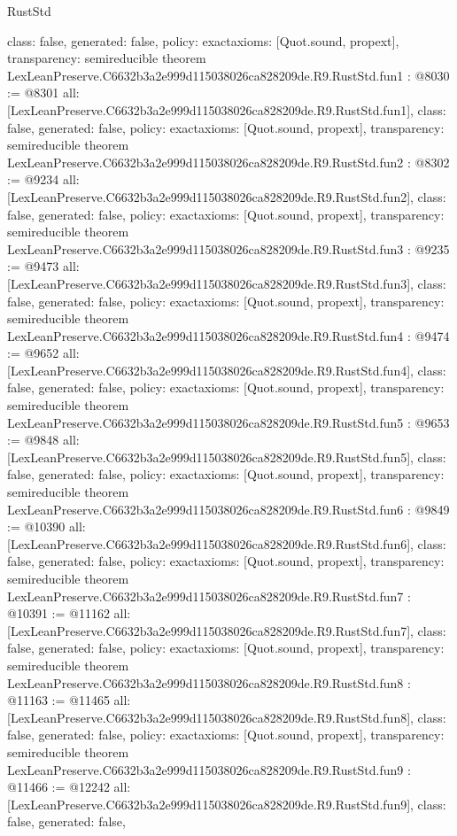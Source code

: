 \begin{lexlean}{RustStd}
\begin{coremodule}
{  class: false,
  generated: false,
  policy: exact{axioms: [Quot.sound, propext]},
  transparency: semireducible
}
theorem LexLeanPreserve.C6632b3a2e999d115038026ca828209de.R9.RustStd.fun1 : @8030 := @8301 {
  all: [LexLeanPreserve.C6632b3a2e999d115038026ca828209de.R9.RustStd.fun1],
  class: false,
  generated: false,
  policy: exact{axioms: [Quot.sound, propext]},
  transparency: semireducible
}
theorem LexLeanPreserve.C6632b3a2e999d115038026ca828209de.R9.RustStd.fun2 : @8302 := @9234 {
  all: [LexLeanPreserve.C6632b3a2e999d115038026ca828209de.R9.RustStd.fun2],
  class: false,
  generated: false,
  policy: exact{axioms: [Quot.sound, propext]},
  transparency: semireducible
}
theorem LexLeanPreserve.C6632b3a2e999d115038026ca828209de.R9.RustStd.fun3 : @9235 := @9473 {
  all: [LexLeanPreserve.C6632b3a2e999d115038026ca828209de.R9.RustStd.fun3],
  class: false,
  generated: false,
  policy: exact{axioms: [Quot.sound, propext]},
  transparency: semireducible
}
theorem LexLeanPreserve.C6632b3a2e999d115038026ca828209de.R9.RustStd.fun4 : @9474 := @9652 {
  all: [LexLeanPreserve.C6632b3a2e999d115038026ca828209de.R9.RustStd.fun4],
  class: false,
  generated: false,
  policy: exact{axioms: [Quot.sound, propext]},
  transparency: semireducible
}
theorem LexLeanPreserve.C6632b3a2e999d115038026ca828209de.R9.RustStd.fun5 : @9653 := @9848 {
  all: [LexLeanPreserve.C6632b3a2e999d115038026ca828209de.R9.RustStd.fun5],
  class: false,
  generated: false,
  policy: exact{axioms: [Quot.sound, propext]},
  transparency: semireducible
}
theorem LexLeanPreserve.C6632b3a2e999d115038026ca828209de.R9.RustStd.fun6 : @9849 := @10390 {
  all: [LexLeanPreserve.C6632b3a2e999d115038026ca828209de.R9.RustStd.fun6],
  class: false,
  generated: false,
  policy: exact{axioms: [Quot.sound, propext]},
  transparency: semireducible
}
theorem LexLeanPreserve.C6632b3a2e999d115038026ca828209de.R9.RustStd.fun7 : @10391 := @11162 {
  all: [LexLeanPreserve.C6632b3a2e999d115038026ca828209de.R9.RustStd.fun7],
  class: false,
  generated: false,
  policy: exact{axioms: [Quot.sound, propext]},
  transparency: semireducible
}
theorem LexLeanPreserve.C6632b3a2e999d115038026ca828209de.R9.RustStd.fun8 : @11163 := @11465 {
  all: [LexLeanPreserve.C6632b3a2e999d115038026ca828209de.R9.RustStd.fun8],
  class: false,
  generated: false,
  policy: exact{axioms: [Quot.sound, propext]},
  transparency: semireducible
}
theorem LexLeanPreserve.C6632b3a2e999d115038026ca828209de.R9.RustStd.fun9 : @11466 := @12242 {
  all: [LexLeanPreserve.C6632b3a2e999d115038026ca828209de.R9.RustStd.fun9],
  class: false,
  generated: false,
}
\end{coremodule}
\end{lexlean}
